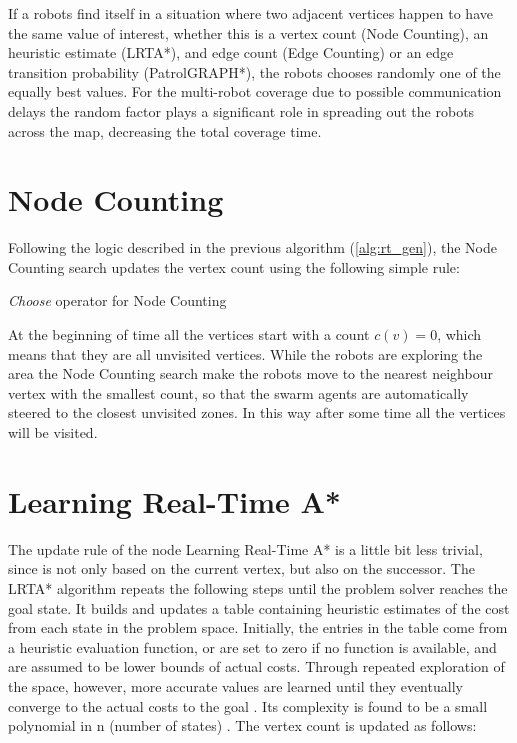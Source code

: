 If a robots find itself in a situation where two adjacent vertices happen to have the same value of interest, whether this is a vertex count (Node Counting), an heuristic estimate (LRTA*), and edge count (Edge Counting) or an edge transition probability (PatrolGRAPH*), the robots chooses randomly one of the equally best values. For the multi-robot coverage due to possible communication delays the random factor plays a significant role in spreading out the robots across the map, decreasing the total coverage time.




\section{Node Counting}

Following the logic described in the previous algorithm (\ref{alg:rt_gen}), the Node Counting search updates the vertex count using the following simple rule:

\begin{algorithm}
\begin{algorithmic}[1]
 \label{a:find_next_nc}
\label{eq:nc_rule}
\end{algorithmic}
\caption{\emph{Choose} operator for Node Counting}\label{alg:rt_nc}
\end{algorithm}


At the beginning of time all the vertices start with a count $c(v)=0$, which means that they are all unvisited vertices. While the robots are exploring the area the Node Counting search make the robots move to the nearest neighbour vertex with the smallest count, so that the swarm agents are automatically steered to the closest unvisited zones. In this way after some time all the vertices will be visited.

\section{Learning Real-Time A*}
\label{sec:LRTAstar}

The update rule of the node Learning Real-Time A* is a little bit less trivial, since is not only based on the current vertex, but also on the successor. The LRTA* algorithm repeats the following steps until the problem solver reaches the goal state. It builds and updates a table containing heuristic estimates of the cost from each state in the problem space. Initially, the entries in the table come from a heuristic evaluation function, or are set to zero if no function is available, and are assumed to be lower bounds of actual costs. Through repeated exploration of the space, however, more accurate values are learned until they eventually converge to the actual costs to the goal \cite{Ishida:1998:RSA:608597.608621}. Its complexity is found to be a small polynomial in n (number of states) \cite{Koenig96easyand}. The vertex count is updated as follows:

